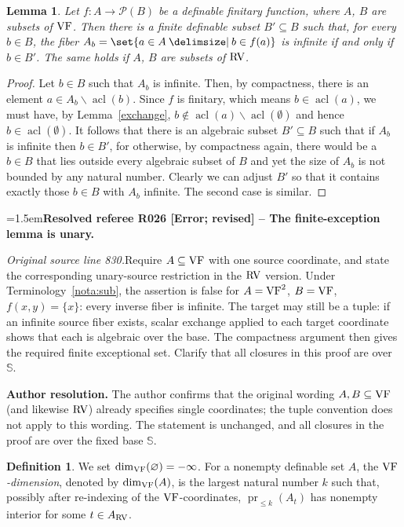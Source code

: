 \documentclass[12pt]{amsart}
\newcommand{\ResolvedRefereeRemark}[5]{%
  \par\medskip\begingroup\normalfont\small\color{gray}%
  \emergencystretch=1.5em\noindent\textbf{Resolved referee R#1 [#2] -- #3.}\par\nobreak\noindent #4\par
  \medskip\color{ResolutionGreen}\noindent\textbf{Author resolution.} #5\par
  \endgroup\medskip
}
\newcommand{\memph}[1]{{\color{magenta}\emph{#1}}}
\theoremstyle{plain}
\newtheorem{lem}[thm]{Lemma}
\theoremstyle{definition}
\newtheorem{defn}[thm]{Definition}
\theoremstyle{remark}
\numberwithin{equation}{section}
\theoremstyle{plain}
\newcommand{\VF}{\textup{VF}}
\newcommand{\RV}{\textup{RV}}
\DeclareMathOperator{\acl}{acl}
\DeclareMathOperator{\pr}{pr}
\newcommand{\0}{\emptyset}
\newcommand{\mdl}[1]{\mathcal{#1}}  %
\newcommand{\fun}{\longrightarrow}
\newcommand{\sub}{\subseteq}
\newcommand{\mi}{\smallsetminus}
\providecommand\given{}
\newcommand\SetSymbol[1][]{%
\nonscript \: #1 \vert
\allowbreak
\nonscript\:
\mathopen{}}
\renewcommand\given{\SetSymbol[\delimsize]}
\begin{document}
\begin{lem}\label{finite:fib:def}
Let $f : A \fun \mdl P(B)$ be a definable finitary function, where $A$, $B$ are subsets of $\VF$. Then there is a finite definable subset $B' \sub B$ such that, for every $b \in B$, the fiber $A_b = \set{a \in A \given b \in f(a)}$ is infinite if and only if  $b \in B'$. The same holds if $A$, $B$ are subsets of $\RV$.
\end{lem}
\begin{proof}
Let $b \in B$ such that $A_b$ is infinite. Then, by compactness, there is an element $a \in A_b \mi \acl(b)$. Since $f$ is finitary, which means $b \in \acl(a)$, we must have, by Lemma~\ref{exchange},  $b \notin \acl(a) \mi \acl(\0)$ and hence $b \in \acl(\0)$. It follows that there is an algebraic subset $B' \sub B$ such that if $A_b$ is infinite then $b \in B'$, for otherwise, by compactness again, there would be a $b \in B$ that lies outside every algebraic subset of $B$ and yet the size of $A_b$ is not bounded by any natural number. Clearly we can adjust $B'$ so that it contains exactly those $b \in  B$ with $A_b$ infinite. The second case is similar.
\end{proof}

\ResolvedRefereeRemark{026}{Error; revised}{The finite-exception lemma is unary}{%
\textit{Original source line 830.}\quad Require $A\subseteq\VF$ with one source coordinate, and state the corresponding unary-source restriction in the $\RV$ version. Under Terminology~\ref{nota:sub}, the assertion is false for $A=\VF^2$, $B=\VF$, $f(x,y)=\{x\}$: every inverse fiber is infinite. The target may still be a tuple: if an infinite source fiber exists, scalar exchange applied to each target coordinate shows that each is algebraic over the base. The compactness argument then gives the required finite exceptional set. Clarify that all closures in this proof are over $\mathbb S$.
}{The author confirms that the original wording $A,B\subseteq\VF$ (and likewise $\RV$) already specifies single coordinates; the tuple convention does not apply to this wording. The statement is unchanged, and all closures in the proof are over the fixed base $\mathbb S$.}


\begin{defn}
We set $\dim_{\VF}(\varnothing)=-\infty$. For a nonempty definable set $A$, the \memph{$\VF$-dimension},  denoted by $\dim_{\VF}(A)$, is the largest natural number $k$ such that, possibly after re-indexing of the $\VF$-coordinates, $\pr_{\leq k}(A_t)$ has nonempty interior for some $t \in A_{\RV}$.
\end{defn}
\end{document}
